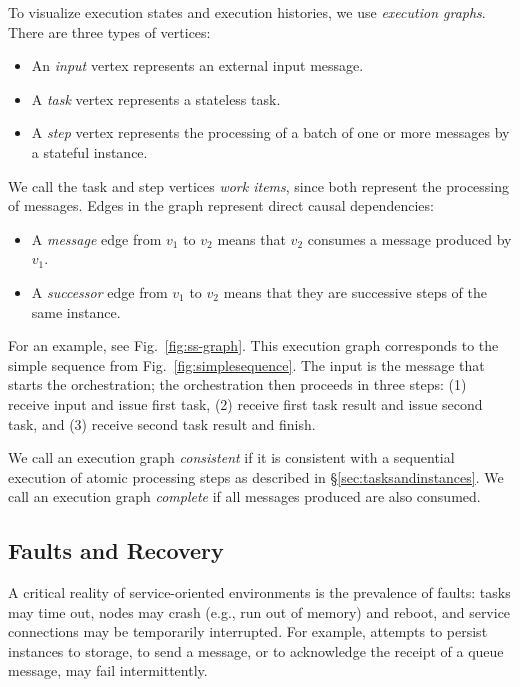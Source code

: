 To visualize execution states and execution histories, we use \emph{execution graphs}. There are three types of vertices:
\begin{itemize}
\item An \emph{input} vertex represents an external input message. 
\item A \emph{task} vertex represents a stateless task.
\item A \emph{step} vertex represents the processing of a batch of one or more messages by a stateful instance.
\end{itemize}
%
We call the task and step vertices \emph{work items}, since both represent the processing of messages. Edges in the graph represent direct causal dependencies:
%
\begin{itemize}
    \item A \emph{message} edge from $v_1$ to $v_2$ means that $v_2$ consumes a message produced by $v_1$. 
    \item A \emph{successor} edge from $v_1$ to $v_2$ means that they are successive steps of the same instance.
\end{itemize}
%
For an example, see Fig.~\ref{fig:ss-graph}. This execution graph corresponds to the simple sequence from Fig.~\ref{fig:simplesequence}. The input is the message that starts the orchestration; the orchestration then proceeds in three steps: (1) receive input and issue first task, (2) receive first task result and issue second task, and (3) receive second task result and finish.

We call an execution graph \emph{consistent} if it is consistent with a sequential execution of atomic processing steps as described in \S\ref{sec:tasksandinstances}. We call an execution graph \emph{complete} if all messages produced are also consumed.


\subsection{Faults and Recovery}\label{sec:faults}


A critical reality of service-oriented environments is the prevalence of faults: tasks may time out, nodes may crash (e.g., run out of memory) and reboot, and service connections may be temporarily interrupted. For example, attempts to persist instances to storage, to send a message, or to acknowledge the receipt of a queue message, may fail intermittently. 

